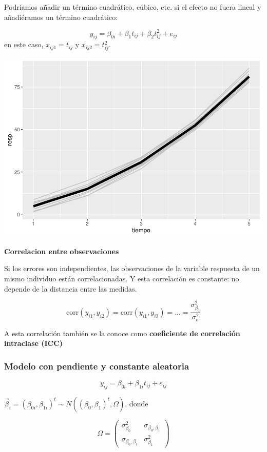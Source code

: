 \documentclass[
]{book}
\begin{document}
Podríamos añadir un término cuadrático, cúbico, etc. si el efecto no fuera lineal y añadiéramos un término cuadrático:

\[y_{ij} = \beta_{0i} + \beta_{1} t_{ij} + \beta_{2} t_{ij}^2 + e_{ij}\]
en este caso, \(x_{ij1}=t_{ij}\) y \(x_{ij2}=t_{ij}^2\).

\includegraphics{fig_out/unnamed-chunk-70-1.pdf}

\textbf{Correlacion entre observaciones}

Si los errores son independientes, las observaciones de la variable respuesta de un mismo individuo están correlacionadas. Y esta correlación es constante: no depende de la distancia entre las medidas.

\[\text{corr}(y_{i1},y_{i2}) = \text{corr}(y_{i1},y_{i3}) = \ldots = \frac{\sigma_{\beta_{0}}^2}{\sigma_{e}^2}\]

A esta correlación también se la conoce como \textbf{coeficiente de correlación intraclase (ICC)}

\hypertarget{modelo-con-pendiente-y-constante-aleatoria}{%
\subsubsection{Modelo con pendiente y constante aleatoria}\label{modelo-con-pendiente-y-constante-aleatoria}}

\[y_{ij} = \beta_{0i} + \beta_{1i} t_{ij} + e_{ij}\]

\(\vec{\beta}_i = (\beta_{0i}, \beta_{1i})^t \sim N\left((\beta_0,\beta_1)^t, \Omega\right)\), donde

\[\Omega= 
\begin{pmatrix}
\sigma_{\beta_0}^2 & \sigma_{\beta_0,\beta_1} \\
\sigma_{\beta_0,\beta_1} & \sigma_{\beta_1}^2
\end{pmatrix}
\]
\end{document}
